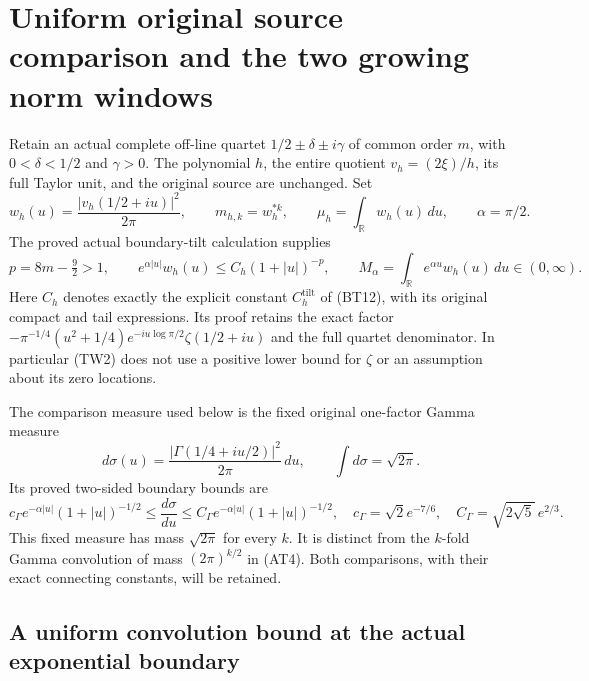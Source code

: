 \documentclass[11pt,a4paper]{article}
\begin{document}
\section{Uniform original source comparison and the two growing norm windows}

Retain an actual complete off-line quartet
$1/2\pm\delta\pm i\gamma$ of common order $m$, with
$0<\delta<1/2$ and $\gamma>0$.  The polynomial $h$, the entire quotient
$v_h=(2\xi)/h$, its full Taylor unit, and the original source are unchanged.
Set
\[
 w_h(u)=\frac{|v_h(1/2+iu)|^2}{2\pi},\qquad
 m_{h,k}=w_h^{*k},\qquad \mu_h=\int_{\mathbb R}w_h(u)\,du,
 \qquad \alpha=\pi/2.
 \tag{TW1}
\]
The proved actual boundary-tilt calculation supplies
\[
 p=8m-\tfrac92>1,\qquad
 e^{\alpha|u|}w_h(u)\leq C_h(1+|u|)^{-p},\qquad
 M_\alpha=\int_{\mathbb R}e^{\alpha u}w_h(u)\,du\in(0,\infty).
 \tag{TW2}
\]
Here $C_h$ denotes exactly the explicit constant $C_h^{\mathrm{tilt}}$
of (BT12), with its original compact and tail expressions.
Its proof retains the exact factor
$-\pi^{-1/4}(u^2+1/4)e^{-iu\log\pi/2}\zeta(1/2+iu)$
and the full quartet denominator.  In particular (TW2) does not use a
positive lower bound for $\zeta$ or an assumption about its zero locations.

The comparison measure used below is the fixed original one-factor
Gamma measure
\[
 d\sigma(u)=\frac{|\Gamma(1/4+iu/2)|^2}{2\pi}\,du,
 \qquad \int d\sigma=\sqrt{2\pi}.
 \tag{TW3}
\]
Its proved two-sided boundary bounds are
\[
 c_\Gamma e^{-\alpha|u|}(1+|u|)^{-1/2}
 \leq\frac{d\sigma}{du}
 \leq C_\Gamma e^{-\alpha|u|}(1+|u|)^{-1/2},
 \quad
 c_\Gamma=\sqrt2e^{-7/6},\quad
 C_\Gamma=\sqrt{2\sqrt5}\,e^{2/3}.
 \tag{TW4}
\]
This fixed measure has mass $\sqrt{2\pi}$ for every $k$.  It is distinct
from the $k$-fold Gamma convolution of mass $(2\pi)^{k/2}$ in (AT4).
Both comparisons, with their exact connecting constants, will be retained.

\subsection{A uniform convolution bound at the actual exponential boundary}
\end{document}
